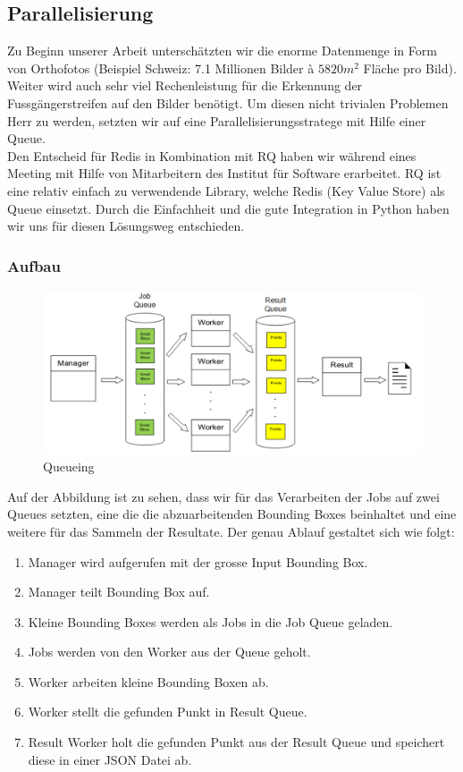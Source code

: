 \subsection{Parallelisierung}
Zu Beginn unserer Arbeit unterschätzten wir die enorme Datenmenge in Form von Orthofotos (Beispiel Schweiz: 7.1 Millionen Bilder à $5820 m^{2}$ Fläche pro Bild). Weiter wird auch sehr viel Rechenleistung für die Erkennung der Fussgängerstreifen auf den Bilder benötigt. Um diesen nicht trivialen Problemen Herr zu werden, setzten wir auf eine Parallelisierungsstratege mit Hilfe einer Queue. \\ 

Den Entscheid für Redis \cite{Redis} in Kombination mit RQ \cite{RQ} haben wir während eines Meeting mit Hilfe von Mitarbeitern des Institut für Software erarbeitet. RQ ist eine relativ einfach zu verwendende Library, welche Redis (Key Value Store) als Queue einsetzt. Durch die Einfachheit und die gute Integration in Python haben wir uns für diesen Lösungsweg entschieden.

\subsubsection{Aufbau}
\label{subsec:ablauf}
\begin{figure}[H]
\includegraphics[width=\textwidth]{images/queuing.png}
\caption[Queueing]{Queueing}
\end{figure}
Auf der Abbildung ist zu sehen, dass wir für das Verarbeiten der Jobs auf zwei Queues setzten, eine die die abzuarbeitenden Bounding Boxes beinhaltet und eine weitere für das Sammeln der Resultate. Der genau Ablauf gestaltet sich wie folgt:
\begin{enumerate}
		\item Manager wird aufgerufen mit der grosse Input Bounding Box.
		\item Manager teilt Bounding Box auf.
		\item Kleine Bounding Boxes werden als Jobs in die Job Queue geladen.
		\item Jobs werden von den Worker aus der Queue geholt.
		\item Worker arbeiten kleine Bounding Boxen ab.
		\item Worker stellt die gefunden Punkt in Result Queue.
		\item Result Worker holt die gefunden Punkt aus der Result Queue und speichert diese in einer JSON Datei ab. 
\end{enumerate}
\newpage









